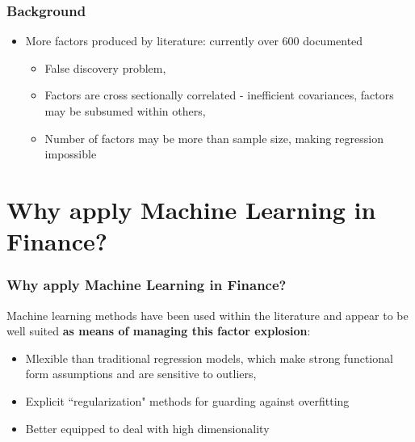 \documentclass[aspectratio=169]{beamer}
\begin{document}
\begin{frame}
\frametitle{Background}
\begin{itemize}
\item More factors produced by literature: currently over 600 documented \citep{harvey_census_2019}
\begin{itemize}
	\item False discovery problem, \citep{harvey__2016}
	
	\item Factors are cross sectionally correlated - inefficient covariances, factors may be subsumed within others, \citep{feng_taming_2019}
	
	\item Number of factors may be more than sample size, making regression impossible
\end{itemize}
\end{itemize}
\end{frame}

\section{Why apply Machine Learning in Finance?}


\begin{frame}
\frametitle{Why apply Machine Learning in Finance?}

Machine learning methods have been used within the literature and appear to be well suited \textbf{as means of managing this factor explosion}:
\begin{itemize}
	\item Mlexible than traditional regression models, which make strong functional form assumptions and are sensitive to outliers, \citep{freyberger_dissecting_2017}
	\item Explicit ``regularization" methods for guarding against overfitting
	\item Better equipped to deal with high dimensionality
\end{itemize}
\end{frame}
\end{document}

